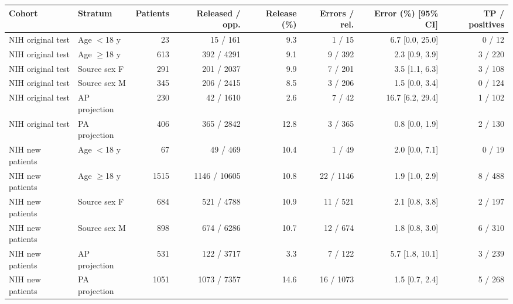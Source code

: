 \begin{center}\small\setlength{\tabcolsep}{3.5pt}
\begin{tabular}{llrrrrrr}\toprule
Cohort & Stratum & Patients & Released / opp. & Release (\%) & Errors / rel. & Error (\%) [95\% CI] & TP / positives\\\midrule
NIH original test & Age $<$18 y & 23 & 15 / 161 & 9.3 & 1 / 15 & 6.7 [0.0, 25.0] & 0 / 12\\
NIH original test & Age $\geq$18 y & 613 & 392 / 4291 & 9.1 & 9 / 392 & 2.3 [0.9, 3.9] & 3 / 220\\
NIH original test & Source sex F & 291 & 201 / 2037 & 9.9 & 7 / 201 & 3.5 [1.1, 6.3] & 3 / 108\\
NIH original test & Source sex M & 345 & 206 / 2415 & 8.5 & 3 / 206 & 1.5 [0.0, 3.4] & 0 / 124\\
NIH original test & AP projection & 230 & 42 / 1610 & 2.6 & 7 / 42 & 16.7 [6.2, 29.4] & 1 / 102\\
NIH original test & PA projection & 406 & 365 / 2842 & 12.8 & 3 / 365 & 0.8 [0.0, 1.9] & 2 / 130\\
NIH new patients & Age $<$18 y & 67 & 49 / 469 & 10.4 & 1 / 49 & 2.0 [0.0, 7.1] & 0 / 19\\
NIH new patients & Age $\geq$18 y & 1515 & 1146 / 10605 & 10.8 & 22 / 1146 & 1.9 [1.0, 2.9] & 8 / 488\\
NIH new patients & Source sex F & 684 & 521 / 4788 & 10.9 & 11 / 521 & 2.1 [0.8, 3.8] & 2 / 197\\
NIH new patients & Source sex M & 898 & 674 / 6286 & 10.7 & 12 / 674 & 1.8 [0.8, 3.0] & 6 / 310\\
NIH new patients & AP projection & 531 & 122 / 3717 & 3.3 & 7 / 122 & 5.7 [1.8, 10.1] & 3 / 239\\
NIH new patients & PA projection & 1051 & 1073 / 7357 & 14.6 & 16 / 1073 & 1.5 [0.7, 2.4] & 5 / 268\\
\bottomrule\end{tabular}\end{center}
